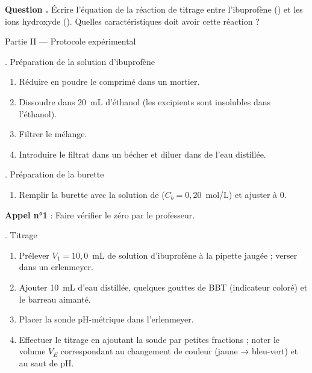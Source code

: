 \documentclass[11pt,a4paper]{article}
\newcommand{\sectitle}[1]{%
  \vspace{6pt}
  \noindent\colorbox{exoheader}{\parbox{\dimexpr\linewidth-2\fboxsep}%
    {\color{white}\bfseries\large\strut\quad #1}}
  \vspace{4pt}
}
\newcommand{\subsectitle}[1]{%
  \vspace{4pt}
  \noindent\colorbox{exolight}{\parbox{\dimexpr\linewidth-2\fboxsep}%
    {\color{exoheader}\bfseries\strut\quad #1}}
  \vspace{2pt}
}
\newcounter{question}
\newcommand{\question}{%
  \stepcounter{question}%
  \noindent\textcolor{exoheader}{\textbf{Question \thequestion.}}\quad
}
\begin{document}
\question Écrire l'équation de la réaction de titrage entre l'ibuprofène ()
et les ions hydroxyde (). Quelles caractéristiques doit avoir cette réaction ? \dotfill

\vspace{0.3cm}\noindent\dotfill

\sectitle{Partie II --- Protocole expérimental}

\subsectitle{1. Préparation de la solution d'ibuprofène}

\begin{enumerate}[leftmargin=1.5cm, label=\textcolor{exoheader}{\textbf{\arabic*.}}]
  \item Réduire en poudre le comprimé dans un mortier.
  \item Dissoudre dans 20~mL d'éthanol (les excipients sont insolubles dans l'éthanol).
  \item Filtrer le mélange.
  \item Introduire le filtrat dans un bécher et diluer dans de l'eau distillée.
\end{enumerate}

\vspace{4pt}
\subsectitle{2. Préparation de la burette}

\begin{enumerate}[leftmargin=1.5cm, label=\textcolor{exoheader}{\textbf{\arabic*.}}]
  \item Remplir la burette avec la solution de  ($C_b = 0{,}20$~mol/L) et ajuster à 0.
\end{enumerate}

\noindent\textcolor{exoheader}{\faCheckSquare\quad \textbf{Appel n°1} : Faire vérifier le zéro par le professeur.}

\vspace{4pt}
\subsectitle{3. Titrage}

\begin{enumerate}[leftmargin=1.5cm, label=\textcolor{exoheader}{\textbf{\arabic*.}}]
  \item Prélever $V_1 = 10{,}0$~mL de solution d'ibuprofène à la pipette jaugée ; verser dans un erlenmeyer.
  \item Ajouter 10~mL d'eau distillée, quelques gouttes de BBT (indicateur coloré) et le barreau aimanté.
  \item Placer la sonde pH-métrique dans l'erlenmeyer.
  \item Effectuer le titrage en ajoutant la soude par petites fractions ;
        noter le volume $V_E$ correspondant au changement de couleur (jaune → bleu-vert) et au saut de pH.
\end{enumerate}
\end{document}

